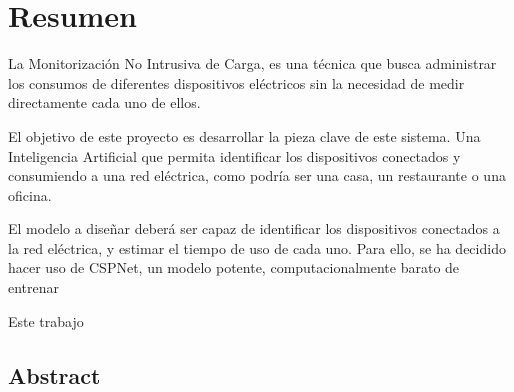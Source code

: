 \chapter*{Resumen}

La Monitorización No Intrusiva de Carga, es una técnica que busca administrar los consumos de diferentes dispositivos eléctricos sin la necesidad de medir directamente cada uno de ellos.

El objetivo de este proyecto es desarrollar la pieza clave de este sistema. Una Inteligencia Artificial que permita identificar los dispositivos conectados y consumiendo a una red eléctrica, como podría ser una casa, un restaurante o una oficina.

El modelo a diseñar deberá ser capaz de identificar los dispositivos conectados a la red eléctrica, y estimar el tiempo de uso de cada uno. Para ello, se ha decidido hacer uso de CSPNet, un modelo potente, computacionalmente barato de entrenar

Este trabajo 

\begin{otherlanguage}{english}
  \chapter*{Abstract}

\end{otherlanguage}


